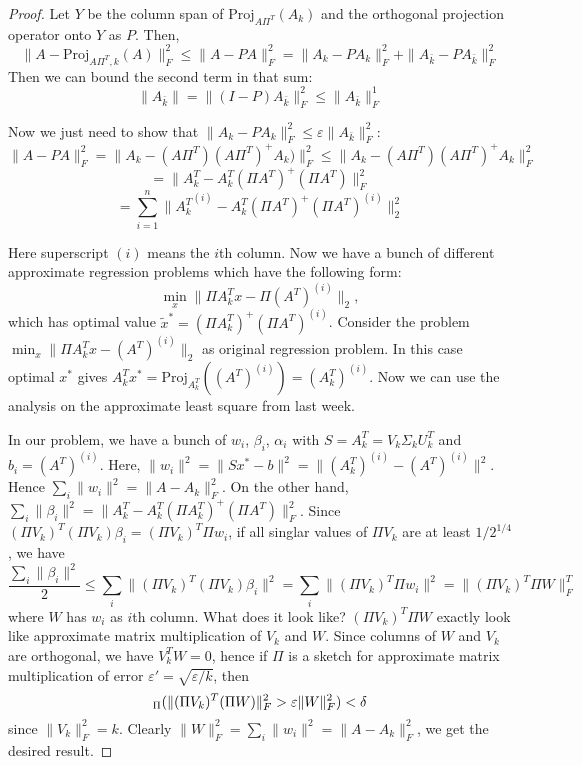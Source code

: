 \documentclass[11pt]{article}
\let\Pr\relax
\DeclareMathOperator*{\Pr}{\mathbb{P}}
\newcommand{\eps}{\varepsilon}
\begin{document}
\begin{proof}
Let $Y$ be the column span of $\mathrm{Proj}_{A\Pi^T}(A_k)$ and the orthogonal projection operator onto $Y$ as $P$. Then,
$$
\|A - \mathrm{Proj}_{A\Pi^T, k}(A) \|_F^2 \leq \|A - PA\|_F^2 = \|A_k - PA_k\|_F^2 + \|A_{\bar{k}} -PA_{\bar{k}}\|_F^2
$$
Then we can bound the second term in that sum:
$$
\|A_{\bar{k}}\| = \|(I - P)A_{\bar{k}}\|_{F}^2 \leq \|A_{\bar{k}}\|_F^1
$$

Now we just need to show that $\|A_k - PA_k\|_F^2 \leq \eps \|A_{\bar{k}}\|_F^2$:
$$
\|A - PA\|_F^2 = \|A_k - (A\Pi^T)(A\Pi^T)^+ A_k)\|_F^2 \leq \|A_k - (A\Pi^T)(A\Pi^T)^+ A_k\|_F^2
$$
$$
= \|A_k^T - A_k^T(\Pi A^T)^+(\Pi A^T)\|_F^2
$$
$$
= \sum_{i=1}^n \|{A_k^T}^{(i)} - A_k^T(\Pi A^T)^+(\Pi A^T)^{(i)}\|_2^2
$$

Here superscript $(i)$ means the $i$th column. Now we have a bunch of different approximate regression problems which have the following form:
$$
\min_{x} \|\Pi A_k^T x - \Pi(A^T)^{(i)}\|_2,
$$
which has optimal value $\tilde{x}^* = (\Pi A_k^T)^+(\Pi A^T)^{(i)}$. Consider the problem $\min_x \|\Pi A_k^T x - (A^T)^{(i)}\|_2$ as original regression problem. In this case optimal $x^*$ gives $A_k^T x^* = \mathrm{Proj}_{A_k^T} ((A^T)^{(i)}) = (A_k^T)^{(i)}$. Now we can use the analysis on the approximate least square from last week.

In our problem, we have a bunch of $w_i$, $\beta_i$, $\alpha_i$ with $S = A_k^T = V_k \Sigma_k U_k^T$ and $b_i = (A^T)^{(i)}$. Here, $\|w_i\|^2 = \|Sx^* - b\|^2 = \|(A_k^T)^{(i)} - (A^T)^{(i)}\|^2$. Hence $\sum_i \|w_i\|^2 = \|A - A_k\|_F^2$. On the other hand, $\sum_i \|\beta_i\|^2 = \|A_k^T - A_k^T(\Pi A_k^T)^+ (\Pi A^T)\|_F^2$. Since $(\Pi V_k)^T(\Pi V_k) \beta_i = (\Pi V_k)^T \Pi w_i$, if all singlar values of $\Pi V_k$ are at least $1/2^{1/4}$, we have
$$
\frac{\sum_i \|\beta_i\|^2}{2} \leq \sum_i \|(\Pi V_k)^T(\Pi V_k) \beta_i\|^2
= \sum_i \| (\Pi V_k)^T \Pi w_i\|^2 = \|(\Pi V_k)^T \Pi W\|_F^T
$$
where $W$ has $w_i$ as $i$th column. What does it look like? $(\Pi V_k)^T \Pi W$ exactly look like approximate matrix multiplication of $V_k$ and $W$. Since columns of $W$ and $V_k$ are orthogonal, we have $V_k^T W = 0$, hence if $\Pi$ is a sketch for approximate matrix multiplication of error $\eps' = \sqrt{\eps/k}$, then
$$
\Pr_{\Pi}(\| (\Pi V_k)^T (\Pi W) \|_F^2 > \eps \|W\|_F^2) < \delta
$$
since $\|V_k\|_F^2 = k$. Clearly $\|W\|_F^2 = \sum_i \|w_i\|^2 = \|A - A_k\|_F^2$, we get the desired result.
\end{proof}
\end{document}

